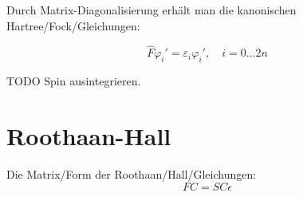 Durch Matrix-Diagonalisierung erhält man die kanonischen Hartree\-/Fock\-/Gleichungen:

\begin{equation} \label{uhf_can}
  \hat{F} \varphi_i' = \varepsilon_i \varphi_i', \quad i = 0 \dots 2n
\end{equation}

\cite[S. 253]{atkins_friedman_2011}

TODO Spin ausintegrieren.

\section{Roothaan-Hall}
Die Matrix\-/Form der Roothaan\-/Hall\-/Gleichungen:
\begin{equation} \label{roothaan}
  FC = SC\epsilon
\end{equation}

\begin{comment}
Im Hartree-Fock-Ansatz wird aus dem Hamilton-Operator, der auf die gesamte Wellenfunktion wirkt, 
ein 1-Elektronen-Operator entwickelt, der Fock-Operator $\hat{F}$.
Da dieser Operator nur auf einzelne Elektronen wirkt, 
kann eine Pseudo-Eigenwerts-Gleichung für jedes Orbital erstellt werden.

Außerdem ist in diesem Ansatz die Elektron-Elektron-Abstoßung nur approximativ behandelt.
Dabei wird vereinfacht für die Repulsionen nur die Abstoßung die ein Elektron in einem gemittelten Potential
, das durch die anderen Elektronen entsteht, berechnet.
Für eine genauere Beschreibung müsste die Abstoßung aller Elektronen-Paare individuell berücksichtigt werden.
TODO Visualisierung.

\subsection{Fock Operator}
- Lösungsweg über das SCF-Verfahren (Matrix-Darstellung, ...)

- Verwendung von Basisfunktionen (Konstruktion der Wellenfunktion)

- Implementierung (größten Probleme: Integral-Evaluierung und
Matrix-Diagonalisierung)

\section{DFT}
- Herleitung (Nur die Idee/Ergebnisse, da wahrscheinlich über
meinem Niveau)

- Konkrete Umsetzung durch die Kohn-Sham-Gleichung (Terme in der
Schrödinger-Glg. + XC-Funktionale)

- Lösung durch FEM + PINVIT (+ LDA)

- Implemtierung über UG4 LUA

Über die Hartree\-/Fock\-/Methode folgen diese Gleichung für jedes Spinorbital:

\end{comment}